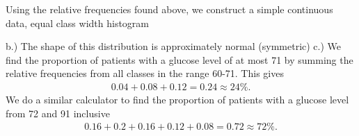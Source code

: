 \documentclass{report}
\begin{document}
    \pagebreak \bigbreak \noindent 
    Using the relative frequencies found above, we construct a simple continuous data, equal class width histogram 
    \bigbreak \noindent 
\begin{figure}[ht]
    \centering
    \label{fig:histo23}
\end{figure}
\bigbreak \noindent 
{}
\bigbreak \noindent 
{}

\bigbreak \noindent 
b.) The shape of this distribution is approximately normal (symmetric)
\bigbreak \noindent 
c.) We find the proportion of patients with a glucose level of at most 71 by summing the relative frequencies from all classes in the range 60-71. This gives
\begin{align*}
    0.04 + 0.08 + 0.12 = 0.24 \approx 24\%
.\end{align*}
\bigbreak \noindent 
We do a similar calculator to find the proportion of patients with a glucose level from 72 and 91 inclusive
\begin{align*}
    0.16 + 0.2 + 0.16 + 0.12 + 0.08 = 0.72 \approx 72\%
.\end{align*}
\bigbreak \noindent 
{}
\end{document}
